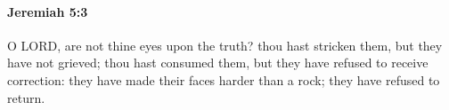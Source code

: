 
		\paragraph{Jeremiah 5:3} %
			\label{JEREMIAH-5-3}

			O LORD, are not thine eyes upon the truth? thou hast stricken them, but they have not grieved; thou hast consumed them, but they have refused to receive correction: they have made their faces harder than a rock; they have refused to return.


